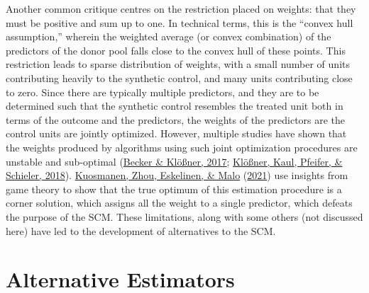 \documentclass[12pt,nobind, a4paper]{reedthesis}
\begin{document}
 Another common critique centres on the restriction placed on weights: that they must be positive and sum up to one. In technical terms, this is the ``convex hull assumption,'' wherein the weighted average (or convex combination) of the predictors of the donor pool falls close to the convex hull of these points. This restriction leads to sparse distribution of weights, with a small number of units contributing heavily to the synthetic control, and many units contributing close to zero. Since there are typically multiple predictors, and they are to be determined such that the synthetic control resembles the treated unit both in terms of the outcome and the predictors, the weights of the predictors are the control units are jointly optimized. However, multiple studies have shown that the weights produced by algorithms using such joint optimization procedures are unstable and sub-optimal (\protect\hyperlink{ref-becker_estimating_2017}{Becker \& Klößner, 2017}; \protect\hyperlink{ref-klosner_comparative_2018}{Klößner, Kaul, Pfeifer, \& Schieler, 2018}). \protect\hyperlink{ref-kuosmanen_design_2021}{Kuosmanen, Zhou, Eskelinen, \& Malo} (\protect\hyperlink{ref-kuosmanen_design_2021}{2021}) use insights from game theory to show that the true optimum of this estimation procedure is a corner solution, which assigns all the weight to a single predictor, which defeats the purpose of the SCM. These limitations, along with some others (not discussed here) have led to the development of alternatives to the SCM.

 \hypertarget{alternative-estimators}{%
 \section{Alternative Estimators}\label{alternative-estimators}}
\end{document}

